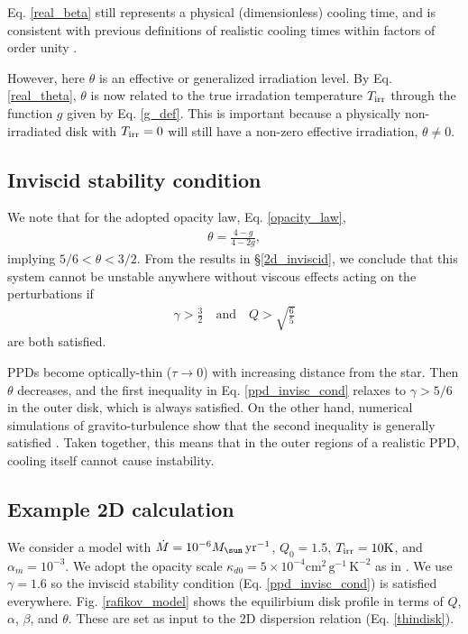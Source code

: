 Eq. \ref{real_beta} still represents a physical (dimensionless) cooling
time, and is consistent with previous definitions of realistic cooling
times within factors of order unity \citep[e.g.][their
Eq. 2]{kratter10}.  

However, here $\theta$ is an effective or generalized
irradiation level. 
By Eq. \ref{real_theta}, $\theta$ is now related to the true
irradation temperature $T_\mathrm{irr}$ through the function $g$ given by 
Eq. \ref{g_def}. This is
important because a physically non-irradiated disk with $T_\mathrm{irr}=0$ will
still have a non-zero effective irradiation, $\theta\neq0$. 


\subsection{Inviscid stability condition}
We note that for the adopted opacity law, Eq. \ref{opacity_law}, 
\begin{align*}
  \theta = \frac{4-g}{4-2g},
\end{align*}
implying $5/6<\theta<3/2$. 
From the results in \S\ref{2d_inviscid}, we conclude that this
system cannot be unstable anywhere without
viscous effects acting on the perturbations if 
\begin{align}
  \gamma > \frac{3}{2} \quad \text{and} \quad Q >
  \sqrt{\frac{6}{5}} \label{ppd_invisc_cond} 
\end{align} 
are both satisfied.  

PPDs become optically-thin ($\tau\to 0$) with 
increasing distance from the star. Then $\theta$ decreases, and
the first inequality in Eq. \ref{ppd_invisc_cond} relaxes to $\gamma >
5/6$ in the outer disk, which is always satisfied.  
On the other hand, numerical simulations of gravito-turbulence
show that the second inequality is generally satisfied \citep{rice11}.  
Taken together, this means that in the outer regions of a realistic PPD,
cooling itself cannot cause instability. 

\subsection{Example 2D calculation}\label{pp2d_example}
We consider a model with $\dot{M} = 10^{-6}M_\sun\,\yr^{-1}$, $Q_0=1.5$, 
$T_\mathrm{irr}=10\mathrm{K}$, and $\alpha_m=10^{-3}$. 
We adopt the opacity scale $\kappa_{d0} =
5\times10^{-4}\mathrm{cm}^2\,\mathrm{g}^{-1}\,\mathrm{K}^{-2}$  as in
. We use 
$\gamma=1.6$ so the inviscid stability condition
(Eq. \ref{ppd_invisc_cond}) is satisfied
everywhere. Fig. \ref{rafikov_model} shows the equilirbium 
disk profile in terms of $Q$, $\alpha$, $\beta$, and $\theta$.  
These are set as input to the 2D dispersion relation
(Eq. \ref{thindisk}).    

